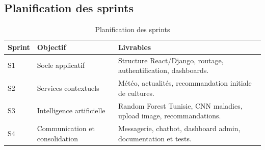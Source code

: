 \subsection{Planification des sprints}
\begin{table}[H]
\centering
\caption{Planification des sprints}
\begin{tabular}{p{2cm}p{5cm}p{7cm}}
\toprule
\textbf{Sprint} & \textbf{Objectif} & \textbf{Livrables} \\
\midrule
S1 & Socle applicatif & Structure React/Django, routage, authentification, dashboards. \\
S2 & Services contextuels & Météo, actualités, recommandation initiale de cultures. \\
S3 & Intelligence artificielle & Random Forest Tunisie, CNN maladies, upload image, recommandations. \\
S4 & Communication et consolidation & Messagerie, chatbot, dashboard admin, documentation et tests. \\
\bottomrule
\end{tabular}
\end{table}
